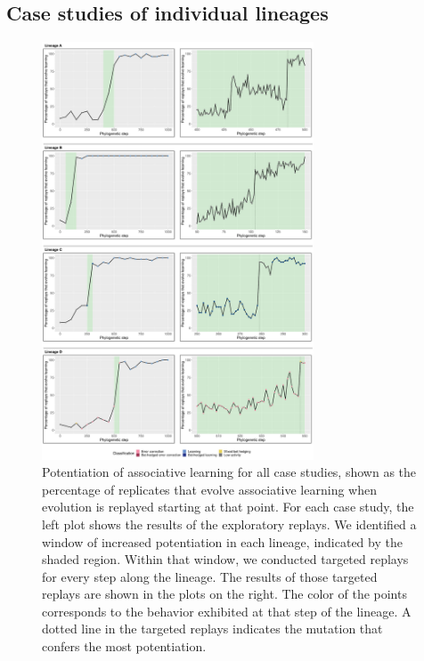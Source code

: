 
\subsection{Case studies of individual lineages}

\begin{figure}[!th]
    \begin{center}
    \includegraphics[width=0.72\textwidth]{02_alife_2023_submission/media/combined_replay_plots.pdf}
    \caption{
        Potentiation of associative learning for all case studies, shown as the percentage of replicates that evolve associative learning when evolution is replayed starting at that point.%
        For each case study, the left plot shows the results of the exploratory replays. 
        We identified a window of increased potentiation in each lineage, indicated by the shaded region. 
        Within that window, we conducted targeted replays for every step along the lineage. 
        The results of those targeted replays are shown in the plots on the right.
        The color of the points corresponds to the behavior exhibited at that step of the lineage. 
        A dotted line in the targeted replays indicates the mutation that confers the most potentiation.
    }
    \label{fig-potentiation-all-case-studies}
    \end{center}
\end{figure}

